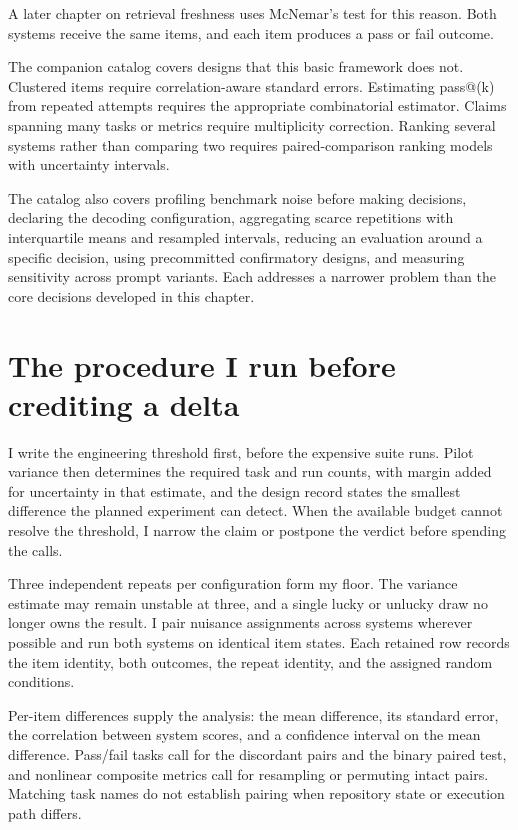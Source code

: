 A later chapter on retrieval freshness uses McNemar's test for this reason. Both systems receive the same items, and each item produces a pass or fail outcome.

The companion catalog covers designs that this basic framework does not. Clustered items require correlation-aware standard errors. Estimating pass@(k) from repeated attempts requires the appropriate combinatorial estimator. Claims spanning many tasks or metrics require multiplicity correction. Ranking several systems rather than comparing two requires paired-comparison ranking models with uncertainty intervals.

The catalog also covers profiling benchmark noise before making decisions, declaring the decoding configuration, aggregating scarce repetitions with interquartile means and resampled intervals, reducing an evaluation around a specific decision, using precommitted confirmatory designs, and measuring sensitivity across prompt variants. Each addresses a narrower problem than the core decisions developed in this chapter.

\section{The procedure I run before crediting a delta}\label{the-procedure-i-run-before-crediting-a-delta}

I write the engineering threshold first, before the expensive suite runs. Pilot variance then determines the required task and run counts, with margin added for uncertainty in that estimate, and the design record states the smallest difference the planned experiment can detect. When the available budget cannot resolve the threshold, I narrow the claim or postpone the verdict before spending the calls.

Three independent repeats per configuration form my floor. The variance estimate may remain unstable at three, and a single lucky or unlucky draw no longer owns the result. I pair nuisance assignments across systems wherever possible and run both systems on identical item states. Each retained row records the item identity, both outcomes, the repeat identity, and the assigned random conditions.

Per-item differences supply the analysis: the mean difference, its standard error, the correlation between system scores, and a confidence interval on the mean difference. Pass/fail tasks call for the discordant pairs and the binary paired test, and nonlinear composite metrics call for resampling or permuting intact pairs. Matching task names do not establish pairing when repository state or execution path differs.


